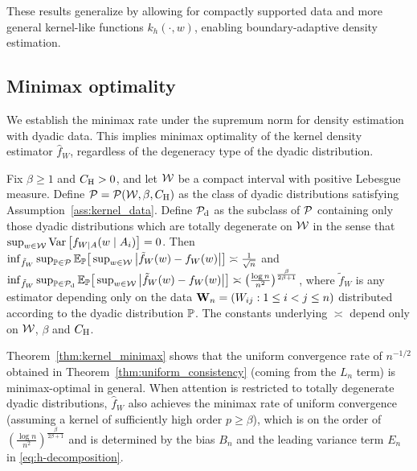 These results generalize \citet*[Theorem~1]{chiang2020empirical}
by allowing for compactly supported data and more general kernel-like
functions $k_h(\cdot,w)$, enabling boundary-adaptive density estimation.

\subsection{Minimax optimality}

We establish the minimax rate under the
supremum norm for density estimation
with dyadic data.
This implies minimax optimality of the kernel density estimator $\hat
f_W$, regardless of the degeneracy type of the dyadic distribution.

\begin{theorem} \label{thm:kernel_minimax}

  Fix $\beta \geq 1$ and $C_\rH > 0$,
  and let $\cW$ be a compact interval with positive Lebesgue measure.
  Define $\cP = \cP(\cW, \beta, C_\rH)$
  as the class of dyadic distributions
  satisfying Assumption~\ref{ass:kernel_data}.
  Define $\cP_\rd$ as the subclass of $\cP$
  containing only those dyadic distributions
  which are totally degenerate on $\cW$ in the sense that
  $\sup_{w \in \cW} \Var\left[f_{W \mid A}(w \mid A_i)\right] = 0$.
  Then
  $\inf_{\tilde f_W} \sup_{\P \in \cP}
  \E_\P\big[\sup_{w \in \cW} \big| \tilde f_W(w) - f_W(w) \big| \big]
  \asymp \frac{1}{\sqrt n}$
  and
  $\inf_{\tilde f_W} \sup_{\P \in \cP_\rd}
  \E_\P\big[\sup_{w \in \cW} \big| \tilde f_W(w) - f_W(w) \big| \big]
  \asymp \big( \frac{\log n}{n^2} \big)^{\frac{\beta}{2\beta+1}}$,
  where $\tilde f_W$ is any estimator depending only on
  the data $\bW_n = (W_{i j}: 1 \leq i < j \leq n)$
  distributed according to the dyadic distribution $\P$.
  The constants underlying $\asymp$ depend only on
  $\cW$, $\beta$ and $C_\rH$.

\end{theorem}

Theorem~\ref{thm:kernel_minimax} shows that the uniform convergence rate of
$n^{-1/2}$
obtained in Theorem~\ref{thm:uniform_consistency}
(coming from the $L_n$ term) is minimax-optimal in general.
When attention is restricted to totally degenerate dyadic distributions,
$\hat f_W$ also achieves the minimax rate of uniform convergence
(assuming a kernel of sufficiently high order $p \geq \beta$),
which is on the order of
$\left(\frac{\log n}{n^2}\right)^{\frac{\beta}{2\beta+1}}$ and
is determined by the bias $B_n$ and the leading variance term $E_n$ in
\eqref{eq:h-decomposition}.

